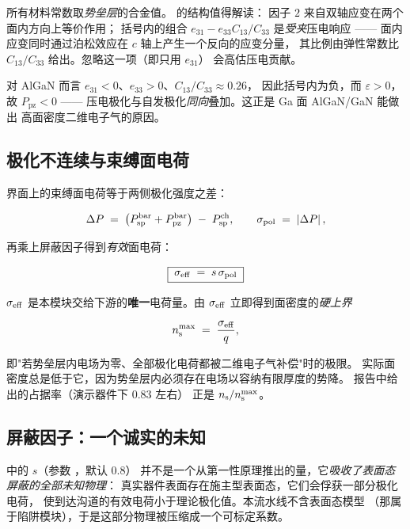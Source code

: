 所有材料常数取\emph{势垒层}的合金值。 的结构值得解读：
因子 $2$ 来自双轴应变在两个面内方向上等价作用；
括号内的组合 $e_{31}-e_{33}C_{13}/C_{33}$ 是\emph{受夹}压电响应 ——
面内应变同时通过泊松效应在 $c$ 轴上产生一个反向的应变分量，
其比例由弹性常数比 $C_{13}/C_{33}$ 给出。忽略这一项（即只用 $e_{31}$）
会高估压电贡献。

对 AlGaN 而言 $e_{31}<0$、$e_{33}>0$、$C_{13}/C_{33}\approx0.26$，
因此括号内为负，而 $\varepsilon>0$，故 $P_{\text{pz}}<0$ ——
压电极化与自发极化\emph{同向}叠加。这正是 Ga 面 AlGaN/GaN 能做出
高面密度二维电子气的原因。

\subsection{极化不连续与束缚面电荷}
\label{sec:pol-sheet}

界面上的束缚面电荷等于两侧极化强度之差：

\begin{equation}
\Delta P \;=\; \left(P_{\text{sp}}^{\text{bar}} + P_{\text{pz}}^{\text{bar}}\right)
\;-\; P_{\text{sp}}^{\text{ch}},
\qquad
\sigma_{\mathrm{pol}} \;=\; \left\lvert \Delta P \right\rvert,
\label{eq:sigma-pol}
\end{equation}

再乘上屏蔽因子得到\emph{有效}面电荷：

\begin{equation}
\boxed{\;\sigma_{\mathrm{eff}} \;=\; s\,\sigma_{\mathrm{pol}}\;}
\label{eq:sigma-eff}
\end{equation}

$\sigma_{\mathrm{eff}}$ 是本模块交给下游的\textbf{唯一}电荷量。由
$\sigma_{\mathrm{eff}}$ 立即得到面密度的\emph{硬上界}

\begin{equation}
n_{\mathrm{s}}^{\max} \;=\; \frac{\sigma_{\mathrm{eff}}}{q},
\label{eq:ns-bound}
\end{equation}

即"若势垒层内电场为零、全部极化电荷都被二维电子气补偿"时的极限。
实际面密度总是低于它，因为势垒层内必须存在电场以容纳有限厚度的势降。
 报告中给出的占据率（演示器件下 $0.83$ 左右）
正是 $n_{\mathrm{s}}/n_{\mathrm{s}}^{\max}$。

\subsection{屏蔽因子：一个诚实的未知}
\label{sec:pol-screening}

 中的 $s$（参数 ，默认 $0.8$）
并不是一个从第一性原理推出的量，它\emph{吸收了表面态屏蔽的全部未知物理}：
真实器件表面存在施主型表面态，它们会俘获一部分极化电荷，
使到达沟道的有效电荷小于理论极化值。本流水线不含表面态模型
（那属于陷阱模块），于是这部分物理被压缩成一个可标定系数。

